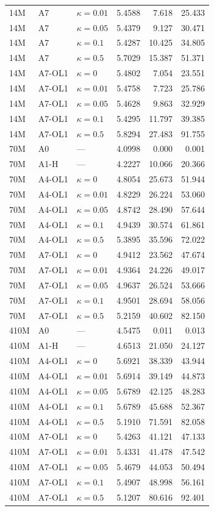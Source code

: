 \begin{table}[p]
\begin{tabular}{@{}lllrrr@{}}
14M & A7 & $\kappa=0.01$ & 5.4588 & 7.618 & 25.433 \\
14M & A7 & $\kappa=0.05$ & 5.4379 & 9.127 & 30.471 \\
14M & A7 & $\kappa=0.1$ & 5.4287 & 10.425 & 34.805 \\
14M & A7 & $\kappa=0.5$ & 5.7029 & 15.387 & 51.371 \\
14M & A7-OL1 & $\kappa=0$ & 5.4802 & 7.054 & 23.551 \\
14M & A7-OL1 & $\kappa=0.01$ & 5.4758 & 7.723 & 25.786 \\
14M & A7-OL1 & $\kappa=0.05$ & 5.4628 & 9.863 & 32.929 \\
14M & A7-OL1 & $\kappa=0.1$ & 5.4295 & 11.797 & 39.385 \\
14M & A7-OL1 & $\kappa=0.5$ & 5.8294 & 27.483 & 91.755 \\
70M & A0 & --- & 4.0998 & 0.000 & 0.001 \\
70M & A1-H & --- & 4.2227 & 10.066 & 20.366 \\
70M & A4-OL1 & $\kappa=0$ & 4.8054 & 25.673 & 51.944 \\
70M & A4-OL1 & $\kappa=0.01$ & 4.8229 & 26.224 & 53.060 \\
70M & A4-OL1 & $\kappa=0.05$ & 4.8742 & 28.490 & 57.644 \\
70M & A4-OL1 & $\kappa=0.1$ & 4.9439 & 30.574 & 61.861 \\
70M & A4-OL1 & $\kappa=0.5$ & 5.3895 & 35.596 & 72.022 \\
70M & A7-OL1 & $\kappa=0$ & 4.9412 & 23.562 & 47.674 \\
70M & A7-OL1 & $\kappa=0.01$ & 4.9364 & 24.226 & 49.017 \\
70M & A7-OL1 & $\kappa=0.05$ & 4.9637 & 26.524 & 53.666 \\
70M & A7-OL1 & $\kappa=0.1$ & 4.9501 & 28.694 & 58.056 \\
70M & A7-OL1 & $\kappa=0.5$ & 5.2159 & 40.602 & 82.150 \\
410M & A0 & --- & 4.5475 & 0.011 & 0.013 \\
410M & A1-H & --- & 4.6513 & 21.050 & 24.127 \\
410M & A4-OL1 & $\kappa=0$ & 5.6921 & 38.339 & 43.944 \\
410M & A4-OL1 & $\kappa=0.01$ & 5.6914 & 39.149 & 44.873 \\
410M & A4-OL1 & $\kappa=0.05$ & 5.6789 & 42.125 & 48.283 \\
410M & A4-OL1 & $\kappa=0.1$ & 5.6789 & 45.688 & 52.367 \\
410M & A4-OL1 & $\kappa=0.5$ & 5.1910 & 71.591 & 82.058 \\
410M & A7-OL1 & $\kappa=0$ & 5.4263 & 41.121 & 47.133 \\
410M & A7-OL1 & $\kappa=0.01$ & 5.4331 & 41.478 & 47.542 \\
410M & A7-OL1 & $\kappa=0.05$ & 5.4679 & 44.053 & 50.494 \\
410M & A7-OL1 & $\kappa=0.1$ & 5.4907 & 48.998 & 56.161 \\
410M & A7-OL1 & $\kappa=0.5$ & 5.1207 & 80.616 & 92.401 \\
\bottomrule
\end{tabular}
\end{table}

